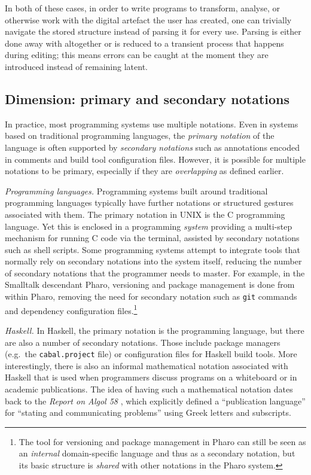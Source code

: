 \documentclass[ twoside,openright,titlepage,numbers=noenddot,headinclude,footinclude,cleardoublepage=empty,abstract=on,
                BCOR=5mm,paper=a4,fontsize=11pt
                ]{scrreprt}
\theoremstyle{definition}
\begin{document}
In both of these cases, in order to write programs to transform,
analyse, or otherwise work with the digital artefact the user has
created, one can trivially navigate the stored structure instead of
parsing it for every use. Parsing is either done away with altogether or
is reduced to a transient process that happens during editing; this
means errors can be caught at the moment they are introduced instead of
remaining latent.

\hypertarget{dimension-primary-and-secondary-notations}{\subsection{Dimension: primary and secondary
notations}\label{dimension-primary-and-secondary-notations}}

In practice, most programming systems use multiple notations. Even in
systems based on traditional programming languages, the \emph{primary
notation} of the language is often supported by \emph{secondary
notations} such as annotations encoded in comments and build tool
configuration files. However, it is possible for multiple notations to
be primary, especially if they are \emph{overlapping} as defined
earlier.

\emph{Programming languages.} Programming systems built around
traditional programming languages typically have further notations or
structured gestures associated with them. The primary notation in UNIX
is the C programming language. Yet this is enclosed in a programming
\emph{system} providing a multi-step mechanism for running C code via
the terminal, assisted by secondary notations such as shell scripts.
Some programming systems attempt to integrate tools that normally rely
on secondary notations into the system itself, reducing the number of
secondary notations that the programmer needs to master. For example, in
the Smalltalk descendant Pharo, versioning and package management is
done from within Pharo, removing the need for secondary notation such as
\texttt{git} commands and dependency configuration files.\footnote{The
  tool for versioning and package management in Pharo can still be seen
  as an \emph{internal} domain-specific language and thus as a secondary
  notation, but its basic structure is \emph{shared} with other
  notations in the Pharo system.}

\emph{Haskell.} In Haskell, the primary notation is the programming
language, but there are also a number of secondary notations. Those
include package managers (e.g.~the \texttt{cabal.project} file) or
configuration files for Haskell build tools. More interestingly, there
is also an informal mathematical notation associated with Haskell that
is used when programmers discuss programs on a whiteboard or in academic
publications. The idea of having such a mathematical notation dates back
to the \emph{Report on Algol 58} \parencite{Alg58}, which explicitly
defined a ``publication language'' for ``stating and communicating
problems'' using Greek letters and subscripts.
\end{document}
